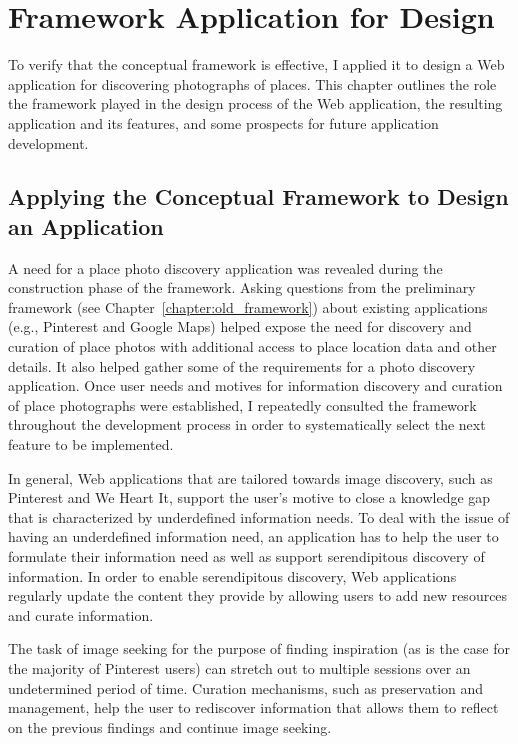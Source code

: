 \chapter{Framework Application for Design}
\label{chapter:application}

To verify that the conceptual framework is effective, I applied it to design a Web application for discovering photographs of places. This chapter outlines the role the framework played in the design process of the Web application, the resulting application and its features, and some prospects for future application development. 

{\section{Applying the Conceptual Framework to Design an Application}
A need for a place photo discovery application was revealed during the construction phase of the framework. Asking questions from the preliminary framework (see Chapter~\ref{chapter:old_framework}) about existing applications (e.g., Pinterest and Google Maps) helped expose the need for discovery and curation of place photos with additional access to place location data and other details. It also helped gather some of the requirements for a photo discovery application. Once user needs and motives for information discovery and curation of place photographs were established, I repeatedly consulted the framework throughout the development process in order to systematically select the next feature to be implemented.

In general, Web applications that are tailored towards image discovery, such as Pinterest and We Heart It, support the user's motive to close a knowledge gap that is characterized by underdefined information needs. To deal with the issue of having an underdefined information need, an application has to help the user to formulate their information need as well as support serendipitous discovery of information. In order to enable serendipitous discovery, Web applications regularly update the content they provide by allowing users to add new resources and curate information. 

The task of image seeking for the purpose of finding inspiration (as is the case for the majority of Pinterest users) can stretch out to multiple sessions over an undetermined period of time. Curation mechanisms, such as preservation and management, help the user to rediscover information that allows them to reflect on the previous findings and continue image seeking.  

}
